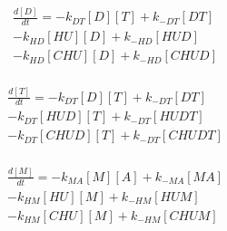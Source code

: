 \begin{equation}
\begin{split}
\frac{d[D]}{dt} =     - k_{DT}[D][T]    + k_{-DT}[DT]     \\%
                      - k_{HD}[HU][D]   + k_{-HD}[HUD]    \\%
                      - k_{HD}[CHU][D]  + k_{-HD}[CHUD]   \\%
\end{split}
\end{equation}

\begin{equation}
\begin{split}
\frac{d[T]}{dt} =     - k_{DT}[D][T]    + k_{-DT}[DT]     \\%
                      - k_{DT}[HUD][T]  + k_{-DT}[HUDT]   \\%
                      - k_{DT}[CHUD][T] + k_{-DT}[CHUDT]  \\%
\end{split}
\end{equation}

\begin{equation}
\begin{split}
\frac{d[M]}{dt} =     - k_{MA}[M][A]    + k_{-MA}[MA]     \\%
                      - k_{HM}[HU][M]   + k_{-HM}[HUM]    \\%
                      - k_{HM}[CHU][M]  + k_{-HM}[CHUM]   \\%
\end{split}
\end{equation}

